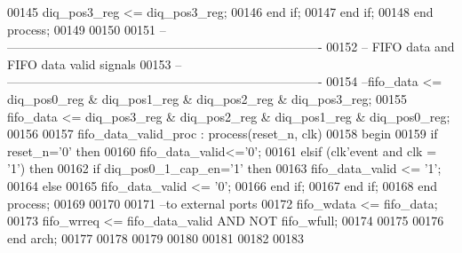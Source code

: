 \begin{DoxyCode}
00145                 \textcolor{vhdlchar}{diq_pos3_reg} \textcolor{vhdlchar}{<=} \textcolor{vhdlchar}{diq_pos3_reg};
00146             \textcolor{keywordflow}{end} \textcolor{keywordflow}{if}; 
00147         \textcolor{keywordflow}{end} \textcolor{keywordflow}{if};
00148     \textcolor{keywordflow}{end} \textcolor{keywordflow}{process};
00149  
00150 
00151 \textcolor{keyword}{-- ----------------------------------------------------------------------------}
00152 \textcolor{keyword}{-- FIFO data and FIFO data valid signals}
00153 \textcolor{keyword}{-- ---------------------------------------------------------------------------- }
00154 \textcolor{keyword}{--fifo\_data <= diq\_pos0\_reg & diq\_pos1\_reg & diq\_pos2\_reg & diq\_pos3\_reg;}
00155 \textcolor{vhdlchar}{fifo_data} \textcolor{vhdlchar}{<=} \textcolor{vhdlchar}{diq_pos3_reg} \textcolor{vhdlchar}{&} \textcolor{vhdlchar}{diq_pos2_reg} \textcolor{vhdlchar}{&} \textcolor{vhdlchar}{diq_pos1_reg} \textcolor{vhdlchar}{&} \textcolor{vhdlchar}{diq_pos0_reg};
00156 
00157 fifo\_data\_valid\_proc : \textcolor{keywordflow}{process}(reset_n, clk)
00158 \textcolor{vhdlkeyword}{    begin}
00159       \textcolor{keywordflow}{if} \textcolor{vhdlchar}{reset_n}\textcolor{vhdlchar}{=}\textcolor{vhdlchar}{'}\textcolor{vhdllogic}{}\textcolor{vhdllogic}{0}\textcolor{vhdlchar}{'} \textcolor{keywordflow}{then}
00160          \textcolor{vhdlchar}{fifo_data_valid}\textcolor{vhdlchar}{<=}\textcolor{vhdlchar}{'}\textcolor{vhdllogic}{}\textcolor{vhdllogic}{0}\textcolor{vhdlchar}{'}; 
00161       \textcolor{keywordflow}{elsif} \textcolor{vhdlchar}{(}\textcolor{vhdlchar}{clk}\textcolor{vhdlchar}{'}\textcolor{vhdlkeyword}{event} \textcolor{keywordflow}{and} \textcolor{vhdlchar}{clk} \textcolor{vhdlchar}{=} \textcolor{vhdlchar}{'}\textcolor{vhdllogic}{}\textcolor{vhdllogic}{1}\textcolor{vhdlchar}{'}\textcolor{vhdlchar}{)} \textcolor{keywordflow}{then}
00162             \textcolor{keywordflow}{if} \textcolor{vhdlchar}{diq_pos0_1_cap_en}\textcolor{vhdlchar}{=}\textcolor{vhdlchar}{'}\textcolor{vhdllogic}{}\textcolor{vhdllogic}{1}\textcolor{vhdlchar}{'} \textcolor{keywordflow}{then} 
00163             \textcolor{vhdlchar}{fifo_data_valid} \textcolor{vhdlchar}{<=} \textcolor{vhdlchar}{'}\textcolor{vhdllogic}{}\textcolor{vhdllogic}{1}\textcolor{vhdlchar}{'};
00164             \textcolor{keywordflow}{else} 
00165                 \textcolor{vhdlchar}{fifo_data_valid} \textcolor{vhdlchar}{<=} \textcolor{vhdlchar}{'}\textcolor{vhdllogic}{}\textcolor{vhdllogic}{0}\textcolor{vhdlchar}{'};
00166             \textcolor{keywordflow}{end} \textcolor{keywordflow}{if}; 
00167         \textcolor{keywordflow}{end} \textcolor{keywordflow}{if};
00168     \textcolor{keywordflow}{end} \textcolor{keywordflow}{process};
00169     
00170     
00171 \textcolor{keyword}{--to external ports    }
00172 \textcolor{vhdlchar}{fifo_wdata} \textcolor{vhdlchar}{<=} \textcolor{vhdlchar}{fifo_data};
00173 \textcolor{vhdlchar}{fifo_wrreq} \textcolor{vhdlchar}{<=} \textcolor{vhdlchar}{fifo_data_valid} \textcolor{keywordflow}{AND} \textcolor{keywordflow}{NOT} \textcolor{vhdlchar}{fifo_wfull};
00174     
00175  
00176 \textcolor{keywordflow}{end} \textcolor{vhdlchar}{arch};   
00177 
00178 
00179 
00180 
00181 
00182 
00183 
\end{DoxyCode}
